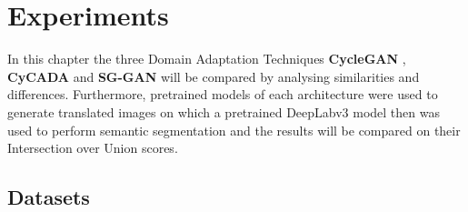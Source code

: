 \chapter{Experiments}
\label{sec:experiments}

In this chapter the three Domain Adaptation Techniques \textbf{CycleGAN} \cite{DBLP:journals/corr/ZhuPIE17}, \textbf{CyCADA} \cite{DBLP:journals/corr/abs-1711-03213} and \textbf{SG-GAN} \cite{DBLP:journals/corr/abs-1801-01726} will be compared by analysing similarities and differences. Furthermore, pretrained models of each architecture were used to generate translated images on which a pretrained DeepLabv3 \cite{DBLP:journals/corr/ChenPSA17} model then was used to perform semantic segmentation and the results will be compared on their Intersection over Union scores.


\section{Datasets}

